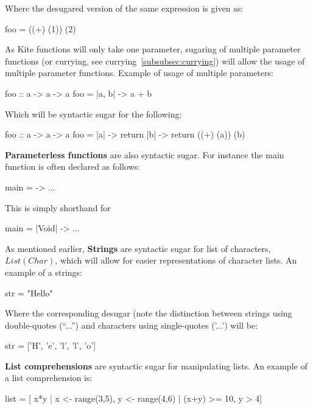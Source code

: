 Where the desugared version of the same expression is given as:

\begin{kite}
foo = ((+) (1)) (2)
\end{kite}

As Kite functions will only take one parameter, sugaring of multiple parameter functions (or currying, see currying~\ref{subsubsec:currying}) will allow the usage of multiple parameter functions. Example of usage of multiple parameters:

\begin{kite}
foo :: a -> a -> a
foo = |a, b| -> {
  a + b
}
\end{kite}

Which will be syntactic sugar for the following:

\begin{kite}
foo :: a -> a -> a
foo = |a| -> {
  return |b| -> {
    return ((+) (a)) (b)
  }
}
\end{kite}

\textbf{Parameterless functions} are also syntactic sugar. For instance the main function is often declared as follows:

\begin{kite}
main = -> {
  ...
}
\end{kite}

This is simply shorthand for

\begin{kite}
main = |Void| -> {
  ...
}
\end{kite}

As mentioned earlier, \textbf{Strings} are syntactic sugar for list of characters, $List(Char)$, which will allow for easier representations of character lists. An example of a strings:

\begin{kite}
str = "Hello"
\end{kite}

Where the corresponding desugar (note the distinction between strings using double-quotes (``...'') and characters using single-quotes ('...') will be:

\begin{kite}
str = ['H', 'e', 'l', 'l', 'o']
\end{kite}

\label{sec:ex-listcomp}
\textbf{List comprehensions} are syntactic sugar for manipulating lists. An example of a list comprehension is:

\begin{kite}
list = [ x*y | x <- range(3,5), y <- range(4,6) | (x+y) >= 10, y > 4]
\end{kite}


